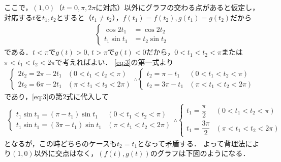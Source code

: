\documentclass[../../main.tex]{subfiles}
\begin{document}
ここで，$(1,0)$（$t=0,\pi,2\pi$に対応）以外にグラフの交わる点があると仮定し，対応する$t$を$t_1,t_2$とすると（$t_1\ne t_2$），$f(t_1)=f(t_2),g(t_1)=g(t_2)$だから
\begin{align}
  \begin{cases}
    \cos2t_1&=\cos2t_2 \\
    t_1\sin t_1&=t_2\sin t_2
  \end{cases} \label{eq:3}
\end{align}
である．$t<\pi$で$g(t)>0$, $t>\pi$で$g(t)<0$だから，$0<t_1<t_2<\pi$または$\pi<t_1<t_2<2\pi$で考えればよい．
\cref{eq:3}の第一式より
\begin{align}
  \begin{cases}
    2t_2=2\pi - 2t_1 & (0<t_1<t_2<\pi) \\
    2t_2=6\pi - 2t_1 & (\pi<t_1<t_2<2\pi)
  \end{cases}
  \therefore
  \begin{cases}
    t_2=\pi  - t_1 & (0<t_1<t_2<\pi) \\
    t_2=3\pi - t_1 & (\pi<t_1<t_2<2\pi)
  \end{cases} \label{eq:4}
\end{align}
であり，\cref{eq:3}の第2式に代入して
\begin{align}
  \begin{cases}
    t_1\sin t_1=(\pi-t_1)\sin t_1 & (0<t_1<t_2<\pi) \\
    t_1\sin t_1=(3\pi-t_1)\sin t_1 & (\pi<t_1<t_2<2\pi)
  \end{cases}
  \therefore
  \begin{cases}
    t_1 = \dfrac{\pi}{2} & (0<t_1<t_2<\pi) \\
    t_1 = \dfrac{3\pi}{2} & (\pi<t_1<t_2<2\pi)
  \end{cases}
\end{align}
となるが，この時どちらのケースも$t_2=t_1$となって矛盾する．
よって背理法により$(1,0)$以外に交点はなく，$(f(t),g(t))$のグラフは下図のようになる．
\end{document}
